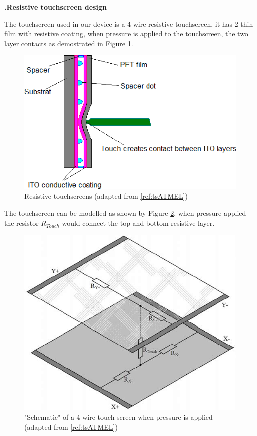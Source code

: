\documentclass[a4paper,notitlepage,10pt]{report}
\newcommand{\tab}{\hspace{0.75cm}}
\newcommand{\fontSubHeading}{\fontsize{10pt}{11pt}\selectfont}
\newcommand{\fontBody}{\fontsize{10pt}{11pt}\selectfont}
\newcounter{sections}
\newcounter{subsections}[sections]
\begin{document}
\begin{multicols}{2}
\fontSubHeading
{}
\textbf{\thesections.\thesubsections\tab Resistive touchscreen design}
\vspace{6pt}

\fontBody
The touchscreen used in our device is a 4-wire resistive touchscreen, it has 2 thin film with resistive coating, when pressure is applied to the touchscreen, the two layer contacts as demostrated in Figure \ref{fig:tsSide}.
\vspace{6pt}

\begin{figure}[H]
	\centering
	\includegraphics[width=0.8\columnwidth]{ts_side}
	\caption{Resistive touchscreens (adapted from \ref{ref:tsATMEL})}
	\label{fig:tsSide}
\end{figure}
\vspace{6pt}

The touchscreen can be modelled as shown by Figure \ref{fig:tsSCH}, when pressure applied the resistor $R_{Touch}$ would connect the top and bottom resistive layer.
\vspace{6pt}

\begin{figure}[H]
	\centering
	\includegraphics[width=0.8\columnwidth]{ts_sch}
	\caption{"Schematic" of a 4-wire touch screen when pressure is applied (adapted from \ref{ref:tsATMEL})}
	\label{fig:tsSCH}
\end{figure}
\vspace{6pt}


\end{multicols}
\end{document}
